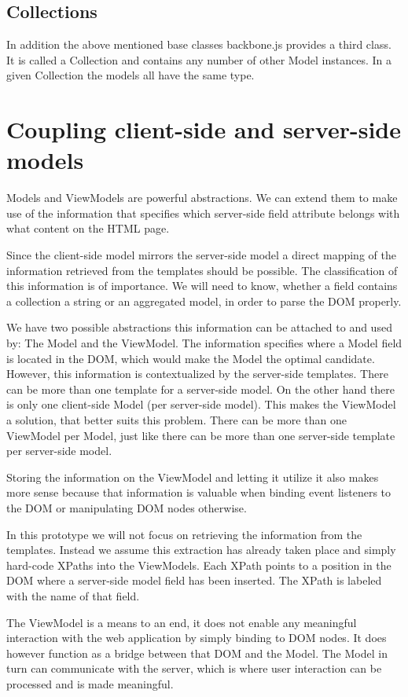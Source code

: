 \subsection{Collections}
In addition the above mentioned base classes backbone.js provides a third class.
It is called a Collection and contains any number of other Model instances.
In a given Collection the models all have the same type.

\section{Coupling client-side and server-side models}
Models and ViewModels are powerful abstractions.
We can extend them to make use of the information that specifies
which server-side field attribute belongs with what content on the HTML page.

Since the client-side model mirrors the server-side model a direct mapping of
the information retrieved from the templates should be possible.
The classification of this information is of importance. We will need to know,
whether a field contains a collection a string or an aggregated model, in order
to parse the DOM properly.

We have two possible abstractions this information can be attached to and
used by: The Model and the ViewModel.
The information specifies where a Model field is located in the DOM, which would
make the Model the optimal candidate. However, this information is
contextualized by the server-side templates. There can be more than one template
for a server-side model. On the other hand there is only one client-side Model
(per server-side model).
This makes the ViewModel a solution, that better suits this problem.
There can be more than one ViewModel per Model, just like there can be more than
one server-side template per server-side model.

Storing the information on the ViewModel and letting it utilize it also makes
more sense because that information is valuable when binding event listeners
to the DOM or manipulating DOM nodes otherwise.

In this prototype we will not focus on retrieving the information from
the templates. Instead we assume this extraction has already taken place and
simply hard-code XPaths into the ViewModels. Each XPath points to a
position in the DOM where a server-side model field has been inserted.
The XPath is labeled with the name of that field.

The ViewModel is a means to an end, it does not enable any meaningful
interaction with the web application by simply binding to DOM nodes.
It does however function as a bridge between that DOM and the Model.
The Model in turn can communicate with the server, which is where user
interaction can be processed and is made meaningful.

